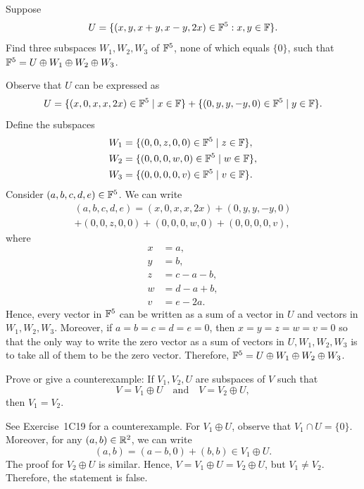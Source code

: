 \begin{exc}
\begin{exercise}
Suppose
\[ U = \{(x,y,x+y,x-y,2x)\in\mathbb{F}^5 : x,y\in\mathbb{F}\}. \]
Find three subspaces $W_1,W_2,W_3$ of $\mathbb{F}^5$, none of which equals $\{0\}$, such
that $\mathbb{F}^5=U\oplus W_1\oplus W_2\oplus W_3$.
\end{exercise}
\begin{solution}
Observe that $U$ can be expressed as
\[ U = \{(x,0,x,x,2x)\in\mathbb{F}^5 \mid x\in\mathbb{F}\}+\{(0,y,y,-y,0)\in\mathbb{F}^5 \mid y\in\mathbb{F}\}. \]
Define the subspaces
\begin{align*}
W_1 &= \{(0,0,z,0,0)\in\mathbb{F}^5 \mid z\in\mathbb{F}\},\\
W_2 &= \{(0,0,0,w,0)\in\mathbb{F}^5 \mid w\in\mathbb{F}\},\\
W_3 &= \{(0,0,0,0,v)\in\mathbb{F}^5 \mid v\in\mathbb{F}\}.
\end{align*}
Consider $(a,b,c,d,e)\in\mathbb{F}^5$. We can write
\begin{multline*}
(a,b,c,d,e) = (x,0,x,x,2x)+(0,y,y,-y,0)\\
  +(0,0,z,0,0)+(0,0,0,w,0)+(0,0,0,0,v),
\end{multline*}
where
\begin{align*}
x &= a,\\
y &= b,\\
z &= c-a-b,\\
w &= d-a+b,\\
v &= e-2a.
\end{align*}
Hence, every vector in $\mathbb{F}^5$ can be written as a sum of a vector in $U$ and
vectors in $W_1,W_2,W_3$. Moreover, if $a=b=c=d=e=0$, then $x=y=z=w=v=0$ so
that the only way to write the zero vector as a sum of vectors in
$U,W_1,W_2,W_3$ is to take all of them to be the zero vector. Therefore,
$\mathbb{F}^5=U\oplus W_1\oplus W_2\oplus W_3$.
\end{solution}

\begin{exercise}
Prove or give a counterexample: If $V_1,V_2,U$ are subspaces of $V$ such that
\[ V=V_1\oplus U \quad\text{and}\quad V=V_2\oplus U, \]
then $V_1=V_2$.
\end{exercise}
\begin{solution}
See Exercise~1C19 for a counterexample. For $V_1\oplus U$, observe that
$V_1\cap U=\{0\}$. Moreover, for any $(a,b)\in\mathbb{R}^2$, we can write
\[ (a,b) = (a-b,0)+(b,b)\in V_1\oplus U. \]
The proof for $V_2\oplus U$ is similar. Hence, $V=V_1\oplus U=V_2\oplus U$, but
$V_1\ne V_2$. Therefore, the statement is false.
\end{solution}


\end{exc}
